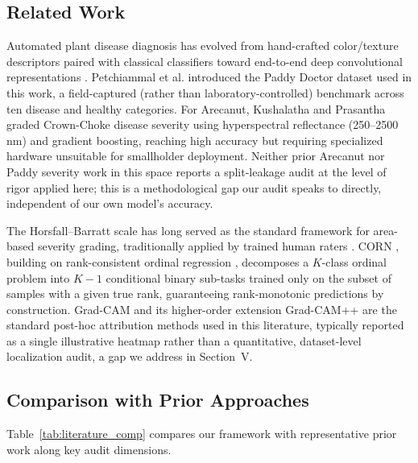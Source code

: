 \documentclass[conference]{IEEEtran}
\begin{document}
\subsection{Related Work}
Automated plant disease diagnosis has evolved from hand-crafted color/texture descriptors paired with classical classifiers toward end-to-end deep convolutional representations \cite{mohanty2016using, ferentinos2018deep}. Petchiammal et al. \cite{petchiammal2023paddy} introduced the Paddy Doctor dataset used in this work, a field-captured (rather than laboratory-controlled) benchmark across ten disease and healthy categories. For Arecanut, Kushalatha and Prasantha \cite{kushalatha2024spectroscopy} graded Crown-Choke disease severity using hyperspectral reflectance (250--2500\,nm) and gradient boosting, reaching high accuracy but requiring specialized hardware unsuitable for smallholder deployment. Neither prior Arecanut nor Paddy severity work in this space reports a split-leakage audit at the level of rigor applied here; this is a methodological gap our audit speaks to directly, independent of our own model's accuracy.

The Horsfall--Barratt scale \cite{horsfall1945fungicides} has long served as the standard framework for area-based severity grading, traditionally applied by trained human raters \cite{bock2022plant}. CORN \cite{shi2021corn}, building on rank-consistent ordinal regression \cite{cao2020rank}, decomposes a $K$-class ordinal problem into $K-1$ conditional binary sub-tasks trained only on the subset of samples with a given true rank, guaranteeing rank-monotonic predictions by construction. Grad-CAM \cite{selvaraju2017grad} and its higher-order extension Grad-CAM++ \cite{chattopadhay2018gradcampp} are the standard post-hoc attribution methods used in this literature, typically reported as a single illustrative heatmap rather than a quantitative, dataset-level localization audit, a gap we address in Section~V.

\subsection{Comparison with Prior Approaches}
Table~\ref{tab:literature_comp} compares our framework with representative prior work along key audit dimensions.

\begin{table}[htbp]
\caption{Comparison with Prior Crop Assessment Frameworks}
\centering
{}
\label{tab:literature_comp}
\end{table}
\end{document}
